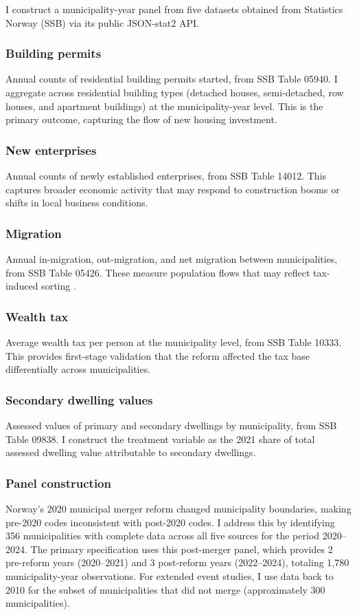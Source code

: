 \documentclass[12pt]{article}
\begin{document}
I construct a municipality-year panel from five datasets obtained from Statistics Norway (SSB) via its public JSON-stat2 API.

\subsubsection*{Building permits} Annual counts of residential building permits started, from SSB Table 05940. I aggregate across residential building types (detached houses, semi-detached, row houses, and apartment buildings) at the municipality-year level. This is the primary outcome, capturing the flow of new housing investment.

\subsubsection*{New enterprises} Annual counts of newly established enterprises, from SSB Table 14012. This captures broader economic activity that may respond to construction booms or shifts in local business conditions.

\subsubsection*{Migration} Annual in-migration, out-migration, and net migration between municipalities, from SSB Table 05426. These measure population flows that may reflect tax-induced sorting \citep{tiebout1956pure, suarez2016benefits}.

\subsubsection*{Wealth tax} Average wealth tax per person at the municipality level, from SSB Table 10333. This provides first-stage validation that the reform affected the tax base differentially across municipalities.

\subsubsection*{Secondary dwelling values} Assessed values of primary and secondary dwellings by municipality, from SSB Table 09838. I construct the treatment variable as the 2021 share of total assessed dwelling value attributable to secondary dwellings.

\subsubsection*{Panel construction} Norway's 2020 municipal merger reform changed municipality boundaries, making pre-2020 codes inconsistent with post-2020 codes. I address this by identifying 356 municipalities with complete data across all five sources for the period 2020--2024. The primary specification uses this post-merger panel, which provides 2 pre-reform years (2020--2021) and 3 post-reform years (2022--2024), totaling 1,780 municipality-year observations. For extended event studies, I use data back to 2010 for the subset of municipalities that did not merge (approximately 300 municipalities).
\end{document}
